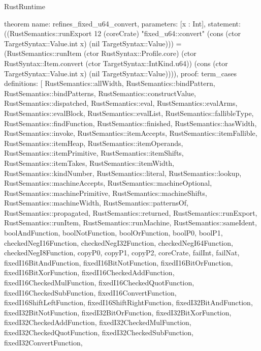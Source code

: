 \begin{lexlean}{RustRuntime}
\begin{semanticmodule}
theorem{
  name: refines_fixed_u64_convert,
  parameters: [x : Int],
  statement: ((RustSemantics::runExport 12 (coreCrate) "fixed_u64::convert" (cons (ctor TargetSyntax::Value.int x) (nil TargetSyntax::Value))) = (RustSemantics::runItem (ctor RustSyntax::Profile.core) (ctor RustSyntax::Item.convert (ctor TargetSyntax::IntKind.u64)) (cons (ctor TargetSyntax::Value.int x) (nil TargetSyntax::Value)))),
  proof: term_cases{
    definitions: [
      RustSemantics::allWidth,
      RustSemantics::bindPattern,
      RustSemantics::bindPatterns,
      RustSemantics::constructValue,
      RustSemantics::dispatched,
      RustSemantics::eval,
      RustSemantics::evalArms,
      RustSemantics::evalBlock,
      RustSemantics::evalList,
      RustSemantics::fallibleType,
      RustSemantics::findFunction,
      RustSemantics::finished,
      RustSemantics::hasWidth,
      RustSemantics::invoke,
      RustSemantics::itemAccepts,
      RustSemantics::itemFallible,
      RustSemantics::itemHeap,
      RustSemantics::itemOperands,
      RustSemantics::itemPrimitive,
      RustSemantics::itemShifts,
      RustSemantics::itemTakes,
      RustSemantics::itemWidth,
      RustSemantics::kindNumber,
      RustSemantics::literal,
      RustSemantics::lookup,
      RustSemantics::machineAccepts,
      RustSemantics::machineOptional,
      RustSemantics::machinePrimitive,
      RustSemantics::machineShifts,
      RustSemantics::machineWidth,
      RustSemantics::patternsOf,
      RustSemantics::propagated,
      RustSemantics::returned,
      RustSemantics::runExport,
      RustSemantics::runItem,
      RustSemantics::runMachine,
      RustSemantics::sameIdent,
      boolAndFunction,
      boolNotFunction,
      boolOrFunction,
      boolP0,
      boolP1,
      checkedNegI16Function,
      checkedNegI32Function,
      checkedNegI64Function,
      checkedNegI8Function,
      copyP0,
      copyP1,
      copyP2,
      coreCrate,
      failInt,
      failNat,
      fixedI16BitAndFunction,
      fixedI16BitNotFunction,
      fixedI16BitOrFunction,
      fixedI16BitXorFunction,
      fixedI16CheckedAddFunction,
      fixedI16CheckedMulFunction,
      fixedI16CheckedQuotFunction,
      fixedI16CheckedSubFunction,
      fixedI16ConvertFunction,
      fixedI16ShiftLeftFunction,
      fixedI16ShiftRightFunction,
      fixedI32BitAndFunction,
      fixedI32BitNotFunction,
      fixedI32BitOrFunction,
      fixedI32BitXorFunction,
      fixedI32CheckedAddFunction,
      fixedI32CheckedMulFunction,
      fixedI32CheckedQuotFunction,
      fixedI32CheckedSubFunction,
      fixedI32ConvertFunction,
}}
\end{semanticmodule}
\end{lexlean}
